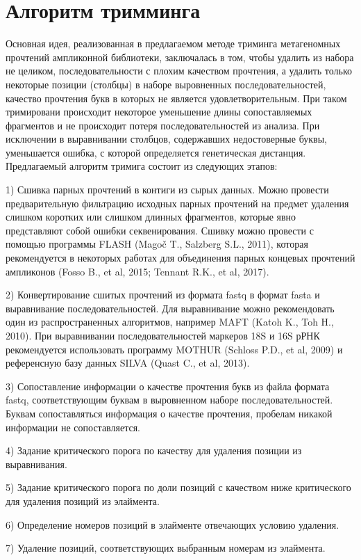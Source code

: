 \documentclass[a4paper,12pt,openany,final]{extreport}
\begin{document}
\section{Алгоритм тримминга}
Основная идея, реализованная в
предлагаемом методе триминга метагеномных прочтений ампликонной
библиотеки, заключалась в том, чтобы удалить из набора не целиком,
последовательности с плохим качеством прочтения, а удалить только
некоторые позиции (столбцы) в наборе выровненных последовательностей,
качество прочтения букв в которых не является удовлетворительным. При
таком тримировани происходит некоторое уменьшение длины сопоставляемых
фрагментов и не происходит потеря последовательностей из анализа. При
исключении в выравнивании столбцов, содержавших недостоверные буквы,
уменьшается ошибка, с которой определяется генетическая дистанция.
Предлагаемый алгоритм тримига состоит из следующих этапов:

1) Сшивка парных прочтений в контиги из сырых данных. Можно провести
предварительную фильтрацию исходных парных прочтений на предмет удаления
слишком коротких или слишком длинных фрагментов, которые явно
представляют собой ошибки секвенирования. Сшивку можно провести с
помощью программы FLASH (Magoč T., Salzberg S.L., 2011), которая
рекомендуется в некоторых работах для объединения парных концевых
прочтений ампликонов (Fosso B., et al, 2015; Tennant R.K., et al, 2017).

2) Конвертирование сшитых прочтений из формата fastq в формат fasta и
выравнивание последовательностей. Для выравнивание можно рекомендовать
один из распространенных алгоритмов, например MAFT (Katoh K., Toh H.,
2010). При выравнивании последовательностей маркеров 18S и 16S рРНК
рекомендуется использовать программу MOTHUR (Schloss P.D., et al, 2009)
и референсную базу данных SILVA (Quast C., et al, 2013).

3) Сопоставление информации о качестве прочтения букв из файла формата
fastq, соответствующим буквам в выровненном наборе последовательностей.
Буквам сопоставляться информация о качестве прочтения, пробелам никакой
информации не сопоставляется.

4) Задание критического порога по качеству для удаления позиции из
выравнивания.

5) Задание критического порога по доли позиций с качеством ниже
критического для удаления позиций из элаймента.

6) Определение номеров позиций в элайменте отвечающих условию удаления.

7) Удаление позиций, соответствующих выбранным номерам из элаймента.
\end{document}
